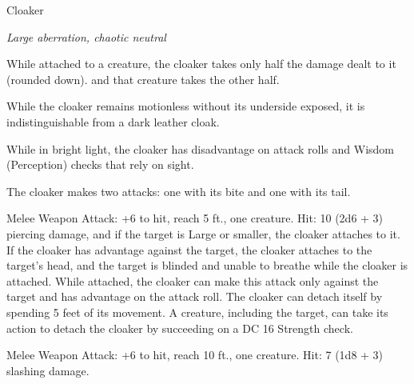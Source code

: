 \begin{monsterbox}{Cloaker}
\begin{hangingpar}
\textit{Large aberration, chaotic neutral}
\end{hangingpar}
\dndline%
\basics[%
armorclass = 14,
hitpoints = 12d10 + 12,
speed = {10 ft., fly 40 ft.}
]
\dndline%
\stats[%
STR = \stat{17},
DEX = \stat{15},
CON = \stat{12},
INT = \stat{13},
WIS = \stat{12},
CHA = \stat{14}
]
\dndline%
\details[%
skills={Stealth +5, },
damageimmunities={},
savingthrows={},
conditionimmunities={},
damageresistances={},
damagevulnerabilities={},
senses={darkvision 60 ft., passive Perception 11},
languages={Deep Speech, Undercommon},
challenge=8
]
\dndline%
\begin{monsteraction}
While attached to a creature, the cloaker takes only half the damage dealt to it (rounded down). and that creature takes the other half.
\end{monsteraction}
\begin{monsteraction}
While the cloaker remains motionless without its underside exposed, it is indistinguishable from a dark leather cloak.
\end{monsteraction}
\begin{monsteraction}
While in bright light, the cloaker has disadvantage on attack rolls and Wisdom (Perception) checks that rely on sight.
\end{monsteraction}
\begin{monsteraction}[Multiattack]
The cloaker makes two attacks: one with its bite and one with its tail.
\end{monsteraction}
\begin{monsteraction}[Bite]
Melee Weapon Attack: +6 to hit, reach 5 ft., one creature. Hit: 10 (2d6 + 3) piercing damage, and if the target is Large or smaller, the cloaker attaches to it. If the cloaker has advantage against the target, the cloaker attaches to the target's head, and the target is blinded and unable to breathe while the cloaker is attached. While attached, the cloaker can make this attack only against the target and has advantage on the attack roll. The cloaker can detach itself by spending 5 feet of its movement. A creature, including the target, can take its action to detach the cloaker by succeeding on a DC 16 Strength check.
\end{monsteraction}
\begin{monsteraction}[Tail]
Melee Weapon Attack: +6 to hit, reach 10 ft., one creature. Hit: 7 (1d8 + 3) slashing damage.

\end{monsteraction}
\end{monsterbox}

